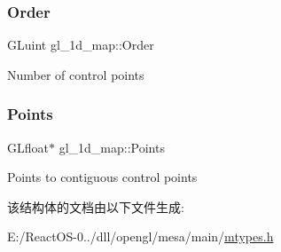 \subsubsection{\texorpdfstring{Order}{Order}}
{\footnotesize\ttfamily G\+Luint gl\+\_\+1d\+\_\+map\+::\+Order}

Number of control points \mbox{\label{structgl__1d__map_a21d455a5a0745a31ed781e0a336bd6a0}} 
\subsubsection{\texorpdfstring{Points}{Points}}
{\footnotesize\ttfamily G\+Lfloat$\ast$ gl\+\_\+1d\+\_\+map\+::\+Points}

Points to contiguous control points 

该结构体的文档由以下文件生成\+:\begin{DoxyCompactItemize}
\item 
E\+:/\+React\+O\+S-\/0../dll/opengl/mesa/main/\hyperlink{mtypes_8h}{mtypes.\+h}\end{DoxyCompactItemize}
